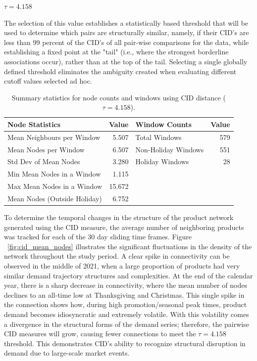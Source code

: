$\tau=4.158$

The selection of this value establishes a statistically based threshold that will be used to determine which pairs are structurally similar, namely, if their CID's are less than 99 percent of the CID's of all pair-wise comparisons for the data, while establishing a fixed point at the "tail" (i.e., where the strongest borderline associations occur), rather than at the top of the tail. Selecting a single globally defined threshold eliminates the ambiguity created when evaluating different cutoff values selected ad hoc.
\begin{table}[ht]
\centering
\caption{Summary statistics for node counts and windows using CID distance ($\tau = 4.158$).}
\label{tab:window_node_summary_cid}
\begin{tabular}{lrlr}
\toprule
\textbf{Node Statistics} & \textbf{Value} & \textbf{Window Counts} & \textbf{Value} \\
\midrule
Mean Neighbours per Window & 5.507 & Total Windows & 579 \\
Mean Nodes per Window & 6.507 & Non-Holiday Windows & 551 \\
Std Dev of Mean Nodes & 3.280 & Holiday Windows & 28 \\
Min Mean Nodes in a Window & 1.115 & & \\
Max Mean Nodes in a Window & 15.672 & & \\
Mean Nodes (Outside Holiday) & 6.752 & & \\
\bottomrule
\end{tabular}
\end{table}

To determine the temporal changes in the structure of the product network generated using the CID measure, the average number of neighboring products was tracked for each of the 30 day sliding time frames. Figure ~\ref{fig:cid_mean_nodes} illustrates the significant fluctuations in the density of the network throughout the study period. A clear spike in connectivity can be observed in the middle of 2021, when a large proportion of products had very similar demand trajectory structures and complexities. At the end of the calendar year, there is a sharp decrease in connectivity, where the mean number of nodes declines to an all-time low at Thanksgiving and Christmas. This single spike in the connection shows how, during high promotion/seasonal peak times, product demand becomes idiosyncratic and extremely volatile. With this volatility comes a divergence in the structural forms of the demand series; therefore, the pairwise CID measures will grow, causing fewer connections to meet the $\tau = 4.158$ threshold. This demonstrates CID’s ability to recognize structural disruption in demand due to large-scale market events.

